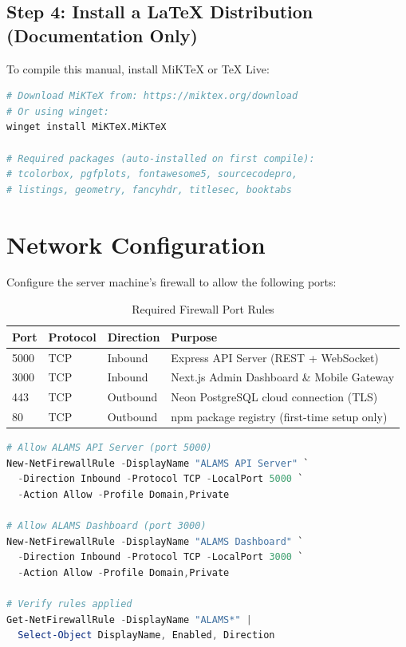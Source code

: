 \subsection{Step 4: Install a LaTeX Distribution (Documentation Only)}

To compile this manual, install MiKTeX or TeX Live:

\begin{tcolorbox}[codebox, title={Install MiKTeX for Windows}]
\begin{lstlisting}[language=bash]
# Download MiKTeX from: https://miktex.org/download
# Or using winget:
winget install MiKTeX.MiKTeX

# Required packages (auto-installed on first compile):
# tcolorbox, pgfplots, fontawesome5, sourcecodepro,
# listings, geometry, fancyhdr, titlesec, booktabs
\end{lstlisting}
\end{tcolorbox}

\section{Network Configuration}

Configure the server machine's firewall to allow the following ports:

\begin{table}[h!]
\centering
\caption{Required Firewall Port Rules}
\label{tab:ports}
\begin{tabularx}{\textwidth}{lllX}
\toprule
\textbf{Port} & \textbf{Protocol} & \textbf{Direction} & \textbf{Purpose}\\
\midrule
\rowcolor{aurxonlightgray}
5000 & TCP & Inbound & Express API Server (REST + WebSocket)\\
3000 & TCP & Inbound & Next.js Admin Dashboard \& Mobile Gateway\\
\rowcolor{aurxonlightgray}
443  & TCP & Outbound & Neon PostgreSQL cloud connection (TLS)\\
80   & TCP & Outbound & npm package registry (first-time setup only)\\
\bottomrule
\end{tabularx}
\end{table}

\begin{tcolorbox}[codebox, title={Windows Firewall Rules (PowerShell — Run as Administrator)}]
\begin{lstlisting}[language=PowerShell]
# Allow ALAMS API Server (port 5000)
New-NetFirewallRule -DisplayName "ALAMS API Server" `
  -Direction Inbound -Protocol TCP -LocalPort 5000 `
  -Action Allow -Profile Domain,Private

# Allow ALAMS Dashboard (port 3000)
New-NetFirewallRule -DisplayName "ALAMS Dashboard" `
  -Direction Inbound -Protocol TCP -LocalPort 3000 `
  -Action Allow -Profile Domain,Private

# Verify rules applied
Get-NetFirewallRule -DisplayName "ALAMS*" | 
  Select-Object DisplayName, Enabled, Direction
\end{lstlisting}
\end{tcolorbox}

